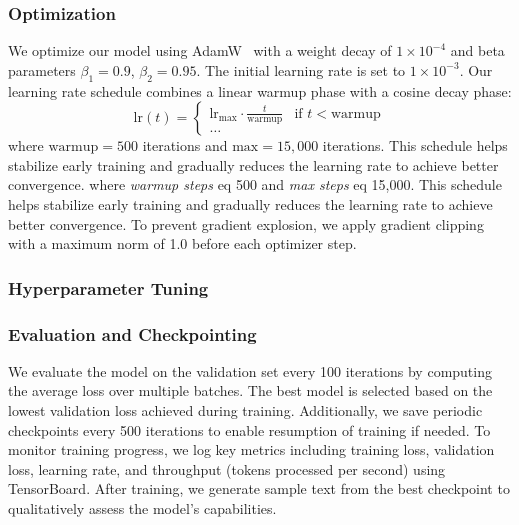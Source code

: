 \subsubsection{Optimization}
We optimize our model using AdamW~\cite{loshchilov2018decoupled} with a weight decay of $1 \times 10^{-4}$ and beta parameters $\beta_1 = 0.9$, $\beta_2 = 0.95$. The initial learning rate is set to $1 \times 10^{-3}$.
Our learning rate schedule combines a linear warmup phase with a cosine decay phase:
\begin{equation}
\text{lr}(t) =
\begin{cases}
\text{lr}_{\text{max}} \cdot \frac{t}{\text{warmup}} & \text{if } t < \text{warmup} \\
\ldots
\end{cases}
\end{equation}
\noindent where $\text{warmup} = 500$ iterations and $\text{max} = 15,000$ iterations. This schedule helps stabilize early training and gradually reduces the learning rate to achieve better convergence.
\noindent where \textit{warmup steps} eq 500 and \textit{max steps} eq 15,000. This schedule helps stabilize early training and gradually reduces the learning rate to achieve better convergence.
To prevent gradient explosion, we apply gradient clipping with a maximum norm of 1.0 before each optimizer step.
\subsubsection{Hyperparameter Tuning}

\subsubsection{Evaluation and Checkpointing}
We evaluate the model on the validation set every 100 iterations by computing the average loss over multiple batches. The best model is selected based on the lowest validation loss achieved during training. Additionally, we save periodic checkpoints every 500 iterations to enable resumption of training if needed.
To monitor training progress, we log key metrics including training loss, validation loss, learning rate, and throughput (tokens processed per second) using TensorBoard. After training, we generate sample text from the best checkpoint to qualitatively assess the model's capabilities.
